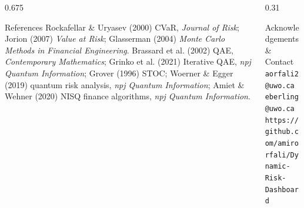 \documentclass[final]{beamer}
\begin{document}
\begin{frame}[t]
\begin{columns}[t,totalwidth=\linewidth]
\end{columns}

\begin{columns}[t,totalwidth=\linewidth]
\begin{column}{0.675\linewidth}
\begin{block}{References}
\footnotesize
Rockafellar \& Uryasev (2000) CVaR, \emph{Journal of Risk}; Jorion (2007) \emph{Value at Risk}; Glasserman (2004) \emph{Monte Carlo Methods in Financial Engineering}. Brassard et al. (2002) QAE, \emph{Contemporary Mathematics}; Grinko et al. (2021) Iterative QAE, \emph{npj Quantum Information}; Grover (1996) STOC; Woerner \& Egger (2019) quantum risk analysis, \emph{npj Quantum Information}; Amiet \& Wehner (2020) NISQ finance algorithms, \emph{npj Quantum Information}.
\end{block}
\end{column}

\begin{column}{0.31\linewidth}
\begin{block}{Acknowledgements \& Contact}
\texttt{aorfali2@uwo.ca \quad eberling@uwo.ca}\\
\texttt{https://github.com/amirorfali/Dynamic-Risk-Dashboard}
\end{block}
\end{column}
\end{columns}
\end{frame}
\end{document}
